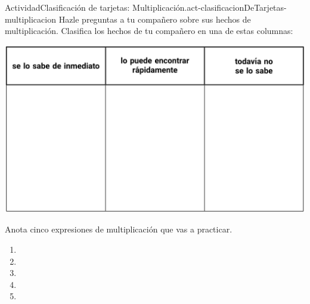 \documentclass[14pt]{extarticle}
\begin{document}
\begin{activity}{Actividad}{Clasificación de tarjetas: Multiplicación.}{act-clasificacionDeTarjetas-multiplicacion}%
Hazle preguntas a tu compañero sobre sus hechos de multiplicación. Clasifica los hechos de tu compañero en una de estas columnas:%
\begin{image}{0}{1}{0}{}%
\includegraphics[max width=1.1\linewidth, center]{external/tikz-source/clasificacionTarjetas-mult-paraBLM.pdf}
\end{image}%
Anota cinco expresiones de multiplicación que vas a practicar.%
%
\begin{enumerate}
\item{}\vspace{0.5cm}%
\item{}\vspace{0.5cm}%
\item{}\vspace{0.5cm}%
\item{}\vspace{0.5cm}%
\item{}\vspace{0.5cm}%
\end{enumerate}
%
\end{activity}
\end{document}
